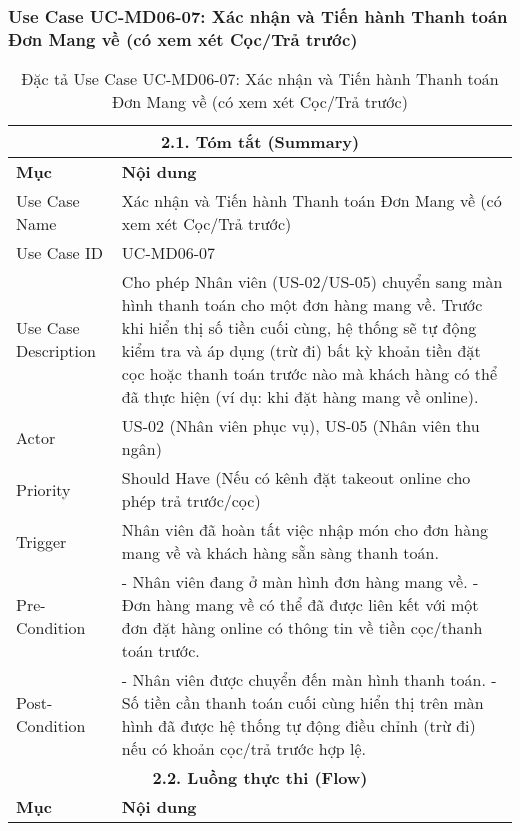 \subsubsection{Use Case UC-MD06-07: Xác nhận và Tiến hành Thanh toán Đơn Mang về (có xem xét Cọc/Trả trước)}
\begin{longtable}{|m{4cm}|p{11cm}|}
\caption{Đặc tả Use Case UC-MD06-07: Xác nhận và Tiến hành Thanh toán Đơn Mang về (có xem xét Cọc/Trả trước)} \label{tab:uc_md06_07_final_v3} \\
\hline
\multicolumn{2}{|c|}{\textbf{2.1. Tóm tắt (Summary)}} \\
\hline
\textbf{Mục} & \textbf{Nội dung} \\
\hline
\endhead %
\hline
\endfoot %
\hline
\endlastfoot %
Use Case Name & Xác nhận và Tiến hành Thanh toán Đơn Mang về (có xem xét Cọc/Trả trước) \\
\hline
Use Case ID & UC-MD06-07 \\
\hline
Use Case Description & Cho phép Nhân viên (US-02/US-05) chuyển sang màn hình thanh toán cho một đơn hàng mang về. Trước khi hiển thị số tiền cuối cùng, hệ thống sẽ tự động kiểm tra và áp dụng (trừ đi) bất kỳ khoản tiền đặt cọc hoặc thanh toán trước nào mà khách hàng có thể đã thực hiện (ví dụ: khi đặt hàng mang về online). \\
\hline
Actor & US-02 (Nhân viên phục vụ), US-05 (Nhân viên thu ngân) \\
\hline
Priority & Should Have (Nếu có kênh đặt takeout online cho phép trả trước/cọc) \\
\hline
Trigger & Nhân viên đã hoàn tất việc nhập món cho đơn hàng mang về và khách hàng sẵn sàng thanh toán. \\
\hline
Pre-Condition & - Nhân viên đang ở màn hình đơn hàng mang về. \newline - Đơn hàng mang về có thể đã được liên kết với một đơn đặt hàng online có thông tin về tiền cọc/thanh toán trước. \\
\hline
Post-Condition & - Nhân viên được chuyển đến màn hình thanh toán. \newline - Số tiền cần thanh toán cuối cùng hiển thị trên màn hình đã được hệ thống tự động điều chỉnh (trừ đi) nếu có khoản cọc/trả trước hợp lệ. \\
\hline
\multicolumn{2}{|c|}{\textbf{2.2. Luồng thực thi (Flow)}} \\
\hline
\textbf{Mục} & \textbf{Nội dung} \\
\hline

\end{longtable}
